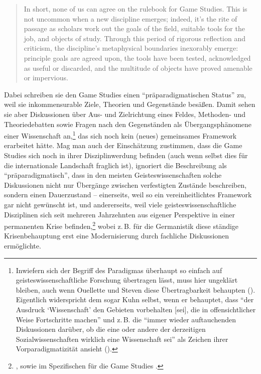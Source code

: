 \documentclass{scrartcl}
\begin{document}
\begin{quote}
   In short, none of us can agree on the rulebook for Game Studies.
   This is not uncommon when a new discipline emerges; indeed, it's the rite of passage as scholars work out the goals of the field, suitable tools for the job, and objects of study.
   Through this period of rigorous reflection and criticism, the discipline's metaphysical boundaries inexorably emerge:
   principle goals are agreed upon, the tools have been tested, acknowledged as useful or discarded, and the multitude of objects have proved amenable or impervious.\autocite[][S.~145]{ouellette_game_2020}
\end{quote}

Dabei schreiben sie den Game Studies einen \enquote{präparadigmatischen Status} zu,\autocite[][S.~148]{ouellette_game_2020} weil sie inkommensurable Ziele, Theorien und Gegenstände besäßen.\autocite[][S.~147--152]{ouellette_game_2020}
Damit sehen sie aber Diskussionen über Aus- und Zielrichtung eines Feldes, Methoden- und Theoriedebatten sowie Fragen nach den Gegenständen als Übergangsphänomene einer Wissenschaft an,\footnote{Inwiefern sich der Begriff des Paradigmas überhaupt so einfach auf geisteswissenschaftliche Forschung übertragen lässt, muss hier ungeklärt bleiben, auch wenn Ouellette und Steven diese Übertragbarkeit behaupten (\autocite[][S.~146]{ouellette_game_2020}). Eigentlich widerspricht dem sogar Kuhn selbst, wenn er behauptet, dass \enquote{der Ausdruck \enquote{Wissenschaft} den Gebieten vorbehalten [sei], die in offensichtlicher Weise Fortschritte machen} und z.\,B. die \enquote{immer wieder auftauchenden Diskussionen darüber, ob die eine oder andere der derzeitigen Sozialwissenschaften wirklich eine Wissenschaft sei} als Zeichen ihrer Vorparadigmatizität ansieht (\autocite[][S.~171]{kuhn_struktur_1997}).} das sich noch kein (neues) gemeinsames Framework erarbeitet hätte.
Mag man auch der Einschätzung zustimmen, dass die Game Studies sich noch in ihrer Disziplinwerdung befinden (auch wenn selbst dies für die internationale Landschaft fraglich ist), ignoriert die Beschreibung als \enquote{präparadigmatisch}, dass in den meisten Geisteswissenschaften solche Diskussionen nicht nur Übergänge zwischen verfestigten Zustände beschreiben, sondern einen Dauerzustand -- einerseits, weil so ein vereinheitlichtes Framework gar nicht gewünscht ist, und andererseits, weil viele geisteswissenschaftliche Disziplinen sich seit mehreren Jahrzehnten aus eigener Perspektive in einer permanenten Krise befinden,\footnote{\autocite[][S.~11]{jahraus_literaturtheorie_2004}, sowie im Spezifischen für die Game Studies \autocite[][S.~19--20]{kanderske_game_2023}.} wobei z.\,B. für die Germanistik diese ständige Krisenbehauptung erst eine Modernisierung durch fachliche Diskussionen ermöglichte.\autocite[][S.~13]{jahraus_literaturtheorie_2004}
\end{document}

